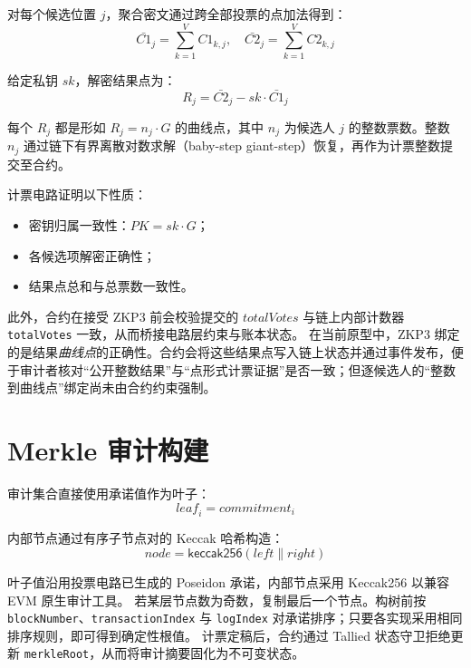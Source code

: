 对每个候选位置 $j$，聚合密文通过跨全部投票的点加法得到：
\begin{equation}
\bar{C1}_j = \sum_{k=1}^{V} C1_{k,j}, \quad \bar{C2}_j = \sum_{k=1}^{V} C2_{k,j}
\end{equation}

给定私钥 $sk$，解密结果点为：
\begin{equation}
R_j = \bar{C2}_j - sk \cdot \bar{C1}_j
\end{equation}

每个 $R_j$ 都是形如 $R_j = n_j \cdot G$ 的曲线点，其中 $n_j$ 为候选人 $j$ 的整数票数。整数 $n_j$ 通过链下有界离散对数求解（baby-step giant-step）恢复，再作为计票整数提交至合约。

计票电路证明以下性质：
\begin{itemize}
    \item 密钥归属一致性：$\mathit{PK} = sk \cdot G$；
    \item 各候选项解密正确性；
    \item 结果点总和与总票数一致性。
\end{itemize}
此外，合约在接受 ZKP3 前会校验提交的 $\mathit{totalVotes}$ 与链上内部计数器 \texttt{totalVotes} 一致，从而桥接电路层约束与账本状态。
在当前原型中，ZKP3 绑定的是结果\emph{曲线点}的正确性。合约会将这些结果点写入链上状态并通过事件发布，便于审计者核对“公开整数结果”与“点形式计票证据”是否一致；但逐候选人的“整数到曲线点”绑定尚未由合约约束强制。

\section{Merkle 审计构建}

审计集合直接使用承诺值作为叶子：
\begin{equation}
\mathit{leaf}_i = \mathit{commitment}_i
\end{equation}

内部节点通过有序子节点对的 Keccak 哈希构造：
\begin{equation}
\mathit{node} = \mathsf{keccak256}(\mathit{left} \parallel \mathit{right})
\end{equation}

叶子值沿用投票电路已生成的 Poseidon 承诺，内部节点采用 Keccak256 以兼容 EVM 原生审计工具。
若某层节点数为奇数，复制最后一个节点。构树前按
\texttt{blockNumber}、\texttt{transactionIndex} 与 \texttt{logIndex} 对承诺排序；只要各实现采用相同排序规则，即可得到确定性根值。
计票定稿后，合约通过 Tallied 状态守卫拒绝更新 \texttt{merkleRoot}，从而将审计摘要固化为不可变状态。

